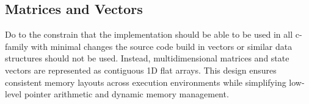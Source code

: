 \subsection{Matrices and Vectors}
Do to the constrain that the implementation should be able to be used in all c-family with minimal changes the source code build in vectors or similar data structures should not be used. 
Instead, multidimensional matrices and state vectors are represented as contiguous 1D flat arrays. This design ensures consistent memory layouts across execution environments while simplifying low-level pointer arithmetic and dynamic memory management.
